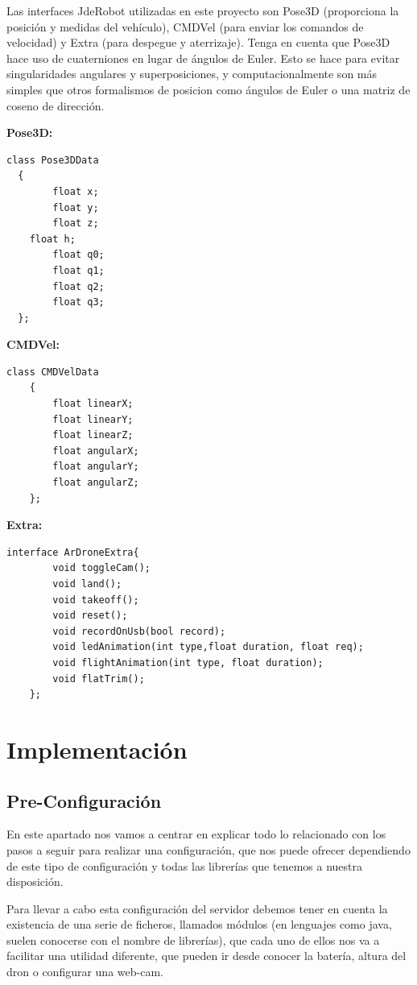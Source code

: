 Las interfaces JdeRobot utilizadas en este proyecto son Pose3D (proporciona la posición y medidas del vehículo), CMDVel (para enviar los comandos de velocidad) y Extra (para despegue y aterrizaje). Tenga en cuenta que Pose3D hace uso de cuaterniones en lugar de ángulos de Euler. Esto se hace para evitar singularidades angulares y superposiciones, y computacionalmente son más simples que otros formalismos de posicion como ángulos de Euler o una matriz de coseno de dirección.

\bigskip
\textbf{Pose3D:}
\begin{lstlisting}[frame=single]
  class Pose3DData
  {
		float x;
		float y;
		float z;
  	float h;
		float q0;
		float q1;
		float q2;
		float q3;
  };
\end{lstlisting}

\textbf{CMDVel:}
\begin{lstlisting}[frame=single]
	class CMDVelData
	{
		float linearX;
		float linearY;
		float linearZ;
		float angularX;
		float angularY;
		float angularZ;										
	};
\end{lstlisting}

\textbf{Extra:}
\begin{lstlisting}[frame=single]
	interface ArDroneExtra{
		void toggleCam();
		void land();
		void takeoff();
		void reset();
		void recordOnUsb(bool record);
		void ledAnimation(int type,float duration, float req);
		void flightAnimation(int type, float duration);
		void flatTrim();
	};
\end{lstlisting}

\section{Implementación}
\subsection{Pre-Configuración}
\label{Pre-Configuracion}
En este apartado nos vamos a centrar en explicar todo lo relacionado con los pasos a seguir para realizar una configuración, que nos puede ofrecer dependiendo de este tipo de configuración y todas las librerías que tenemos a nuestra disposición.

Para llevar a cabo esta configuración del servidor debemos tener en cuenta la existencia de una serie de ficheros, llamados módulos (en lenguajes como java, suelen conocerse con el nombre de librerías), que cada uno de ellos nos va a facilitar una utilidad diferente, que pueden ir desde conocer la batería, altura del dron o configurar una web-cam.

